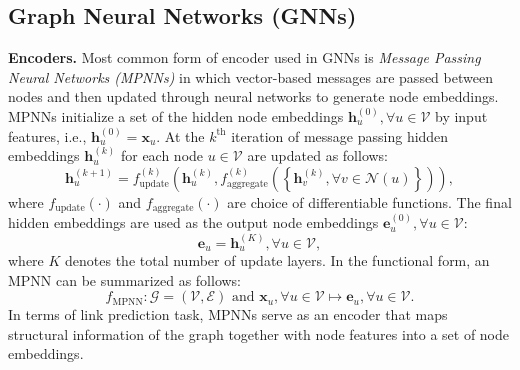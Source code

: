 \documentclass{article}
\begin{document}
\subsection{Graph Neural Networks (GNNs)}
\textbf{Encoders.} Most common form of encoder used in GNNs is \emph{Message Passing Neural Networks (MPNNs)} in which vector-based messages are passed between nodes and then updated through neural networks to generate node embeddings. MPNNs initialize a set of the hidden node embeddings $\mathbf{h}_u^{(0)}, \forall u \in \mathcal{V}$ by input features, i.e., $\mathbf{h}_u^{(0)}=\mathbf{x}_u$. At the $k^{\text{th}}$ iteration of message passing hidden embeddings $\mathbf{h}_u^{(k)}$ for each node $u \in\mathcal{V}$ are updated as follows:
\begin{equation}
    \mathbf{h}_u^{(k+1)} = f_{\operatorname{update}}^{(k)}\left(\mathbf{h}_u^{(k)}, f_{\operatorname{aggregate}}^{(k)}\left(\left\{\mathbf{h}_v^{(k)}, \forall v \in \mathcal{N}(u)\right\}\right)\right),
\end{equation}
where $f_{\operatorname{update}}(\cdot)$ and $f_{\operatorname{aggregate}}(\cdot)$ are choice of differentiable functions. The final hidden embeddings are used as the output node embeddings $\mathbf{e}_u^{(0)}, \forall u \in \mathcal{V}$:
\begin{equation}
    \mathbf{e}_u = \mathbf{h}_u^{(K)}, \forall u \in \mathcal{V}, 
\end{equation}
where $K$ denotes the total number of update layers. In the functional form, an MPNN can be summarized as follows:
\begin{equation}\label{eq:mpnn}
    f_{\operatorname{MPNN}}: \mathcal{G}=(\mathcal{V}, \mathcal{E}) \text{ and } \mathbf{x}_u, \forall u \in \mathcal{V}\longmapsto \mathbf{e}_u, \forall u \in \mathcal{V}.
\end{equation}
In terms of link prediction task, MPNNs serve as an encoder that maps structural information of the graph together with node features into a set of node embeddings. 
\end{document}
